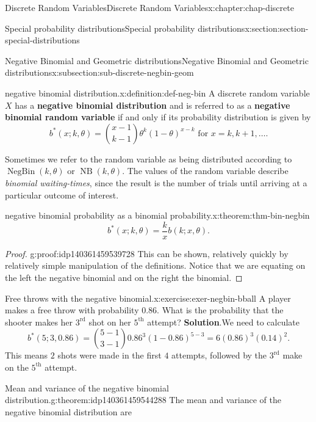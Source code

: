 \documentclass[oneside,10pt,]{book}
\newcommand{\blocktitlefont}{\relax}
\newcommand{\terminology}[1]{\textbf{#1}}
\numberwithin{equation}{section}
\begin{document}
\begin{chapterptx}{Discrete Random Variables}{}{Discrete Random Variables}{}{}{x:chapter:chap-discrete}
\begin{sectionptx}{Special probability distributions}{}{Special probability distributions}{}{}{x:section:section-special-distributions}
\begin{subsectionptx}{Negative Binomial and Geometric distributions}{}{Negative Binomial and Geometric distributions}{}{}{x:subsection:sub-discrete-negbin-geom}
\begin{introduction}{}
\end{introduction}%
\begin{definition}{negative binomial distribution.}{x:definition:def-neg-bin}%
A discrete random variable \(\displaystyle X\) has a \terminology{negative binomial distribution} and is referred to as a \terminology{negative binomial random variable} if and only if its probability distribution is given by%
\begin{equation*}
b^*(x; k, \theta) = {x-1\choose
k-1}\theta^k(1-\theta)^{x-k} \text{ for }x = k, k+1, \dots\text{.}
\end{equation*}
%
\end{definition}
Sometimes we refer to the random variable as being distributed according to \(\operatorname{NegBin}(k, \theta)\) or \(\operatorname{NB}(k, \theta)\).   The values of the random variable describe \emph{binomial waiting-times}, since the result is the number of trials until arriving at a particular outcome of interest.%
\begin{theorem}{negative binomial probability as a binomial probability.}{}{x:theorem:thm-bin-negbin}%
%
\begin{equation*}
b^*(x; k, \theta) = \frac{k}{x}b(k; x, \theta)\text{.}
\end{equation*}
%
\end{theorem}
\begin{proof}{}{g:proof:idp140361459539728}
This can be shown, relatively quickly by relatively simple manipulation of the definitions. Notice that we are equating on the left the negative binomial and on the right the binomial.%
\end{proof}
\begin{inlineexercise}{Free throws with the negative binomial.}{x:exercise:exer-negbin-bball}%
A player makes a free throw with probability \(0.86\). What is the probability that the shooter makes her \(3^{\text{rd}}\) shot on her \(5^{\text{th}}\) attempt?%
\textbf{\blocktitlefont Solution}.\quad{}We need to calculate%
\begin{equation*}
b^*(5; 3, 0.86) =
{5-1\choose3-1}0.86^3(1-0.86)^{5-3}
= 6(0.86)^3(0.14)^2\text{.}
\end{equation*}
This means \(2\) shots were made in the first \(4\) attempts, followed by the \(3^{\text{rd}}\) make on the \(5^{\text{th}}\) attempt.%
\end{inlineexercise}
\begin{theorem}{Mean and variance of the negative binomial distribution.}{}{g:theorem:idp140361459544288}%
The mean and variance of the negative binomial distribution are%

\end{theorem}
\end{subsectionptx}
\end{sectionptx}
\end{chapterptx}
\end{document}
